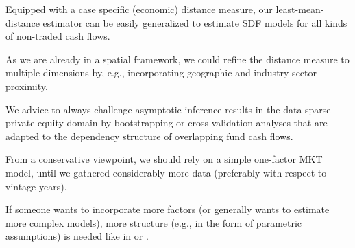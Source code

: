 \documentclass[12pt]{article}
\begin{document}
Equipped with a case specific (economic) distance measure, our least-mean-distance estimator can be easily generalized to estimate SDF models for all kinds of non-traded cash flows.

As we are already in a spatial framework, we could refine the distance measure to multiple dimensions by, e.g., incorporating geographic and industry sector proximity.

We advice to always challenge asymptotic inference results in the data-sparse private equity domain by bootstrapping or cross-validation analyses that are adapted to the dependency structure of overlapping fund cash flows.

From a conservative viewpoint, we should rely on a simple one-factor MKT model, until we gathered considerably more data (preferably with respect to vintage years).

If someone wants to incorporate more factors (or generally wants to estimate more complex models), more structure (e.g., in the form of parametric assumptions) is needed like in \cite{ACGP18} or \cite{GSW19}.









\newpage
\end{document}
